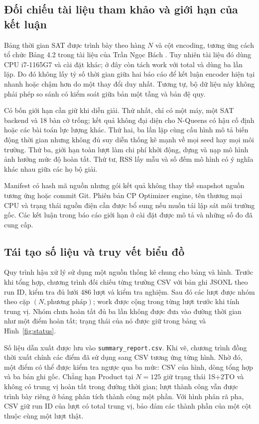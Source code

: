 \subsection{Đối chiếu tài liệu tham khảo và giới hạn của kết luận}
Bảng thời gian SAT được trình bày theo hàng $N$ và cột encoding, tương ứng cách tổ chức Bảng 4.2 trong tài liệu của Trần Ngọc Bách \citep{bach2024}. Tuy nhiên tài liệu đó dùng CPU i7-1165G7 và cài đặt khác; ở đây còn tách work với total và dùng ba lần lặp. Do đó không lấy tỷ số thời gian giữa hai báo cáo để kết luận encoder hiện tại nhanh hoặc chậm hơn do một thay đổi duy nhất. Tương tự, bộ dữ liệu này không phải phép so sánh có kiểm soát giữa bản một tầng và bản đệ quy.

Có bốn giới hạn cần giữ khi diễn giải. Thứ nhất, chỉ có một máy, một SAT backend và 18 bàn cờ trống; kết quả không đại diện cho N-Queens có hậu cố định hoặc các bài toán lực lượng khác. Thứ hai, ba lần lặp cùng cấu hình mô tả biến động thời gian nhưng không đủ suy diễn thống kê mạnh về mọi seed hay mọi môi trường. Thứ ba, giới hạn toàn lượt làm chi phí khởi động, dựng và nạp mô hình ảnh hưởng mức độ hoàn tất. Thứ tư, RSS lấy mẫu và số đếm mô hình có ý nghĩa khác nhau giữa các họ bộ giải.

Manifest có hash mã nguồn nhưng gói kết quả không thay thế snapshot nguồn tương ứng hoặc commit Git. Phiên bản CP Optimizer engine, tên thương mại CPU và trạng thái nguồn điện cần được bổ sung nếu muốn tái lập sát môi trường gốc. Các kết luận trong báo cáo giới hạn ở cài đặt được mô tả và những số đo đã cung cấp.


\subsection{Tái tạo số liệu và truy vết biểu đồ}
\label{sec:reproducibility}
Quy trình hậu xử lý sử dụng một nguồn thống kê chung cho bảng và hình. Trước khi tổng hợp, chương trình đối chiếu từng trường CSV với bản ghi JSONL theo run ID, kiểm tra đủ lưới 486 lượt và kiểm tra nghiệm. Sau đó các lượt được nhóm theo cặp $(N,\text{phương pháp})$; work được cộng trong từng lượt trước khi tính trung vị. Nhóm chưa hoàn tất đủ ba lần không được đưa vào đường thời gian như một điểm hoàn tất; trạng thái của nó được giữ trong bảng và Hình~\ref{fig:status}.

Số liệu dẫn xuất được lưu vào \texttt{summary\_report.csv}. Khi vẽ, chương trình đồng thời xuất chính các điểm đã sử dụng sang CSV tương ứng từng hình. Nhờ đó, một điểm có thể được kiểm tra ngược qua ba mức: CSV của hình, dòng tổng hợp và ba bản ghi gốc. Chẳng hạn Product tại $N=125$ giữ trạng thái 1S+2TO và không có trung vị hoàn tất trong đường thời gian; lượt thành công vẫn được trình bày riêng ở bảng phân tích thành công một phần. Với hình phân rã pha, CSV giữ run ID của lượt có total trung vị, bảo đảm các thành phần của một cột thuộc cùng một lượt thật.

